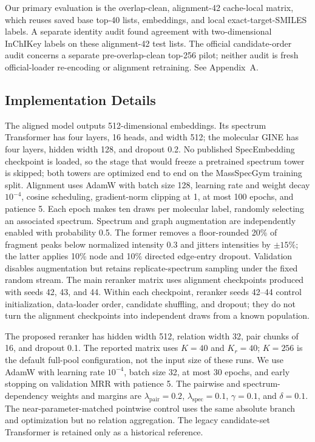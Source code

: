 \documentclass[runningheads]{llncs}
\begin{document}
Our primary evaluation is the overlap-clean, alignment-42 cache-local matrix,
which reuses saved base top-40 lists, embeddings, and local exact-target-SMILES
labels. A separate identity audit found agreement with two-dimensional
InChIKey labels on these alignment-42 test lists. The official candidate-order
audit concerns a separate pre-overlap-clean top-256 pilot; neither audit is
fresh official-loader re-encoding or alignment retraining. See Appendix~A.

\subsection{Implementation Details}

The aligned model outputs 512-dimensional embeddings. Its spectrum Transformer
has four layers, 16 heads, and width 512; the molecular GINE has four layers,
hidden width 128, and dropout 0.2. No published SpecEmbedding checkpoint is
loaded, so the stage that would freeze a pretrained spectrum tower is skipped;
both towers are optimized end to end on the MassSpecGym training split.
Alignment uses AdamW with batch size 128, learning rate and weight decay
$10^{-4}$, cosine scheduling, gradient-norm clipping at 1, at most 100 epochs, and
patience 5. Each epoch makes ten draws per molecular label, randomly selecting
an associated spectrum. Spectrum and graph augmentation are independently
enabled with probability 0.5. The former removes a floor-rounded 20\% of
fragment peaks below normalized intensity 0.3 and jitters intensities by
$\pm15\%$; the latter applies 10\% node and 10\% directed edge-entry dropout.
Validation disables augmentation but retains replicate-spectrum sampling under
the fixed random stream. The main reranker matrix uses alignment checkpoints
produced with seeds 42, 43, and 44. Within each checkpoint, reranker seeds
42--44 control initialization, data-loader order, candidate shuffling, and
dropout; they do not turn the alignment checkpoints into independent draws
from a known population.

The proposed reranker has hidden width 512, relation width 32, pair chunks of
16, and dropout 0.1. The reported matrix uses $K=40$ and $K_r=40$; $K=256$
is the default full-pool configuration, not the input size of these runs.
We use AdamW with learning rate
$10^{-4}$, batch size 32, at most 30 epochs, and early stopping on validation
MRR with patience 5. The pairwise and spectrum-dependency weights and margins
are $\lambda_{\mathrm{pair}}=0.2$, $\lambda_{\mathrm{spec}}=0.1$,
$\gamma=0.1$, and $\delta=0.1$. The near-parameter-matched pointwise control uses
the same absolute branch and optimization but no relation aggregation. The
legacy candidate-set Transformer is retained only as a historical reference.
\end{document}
